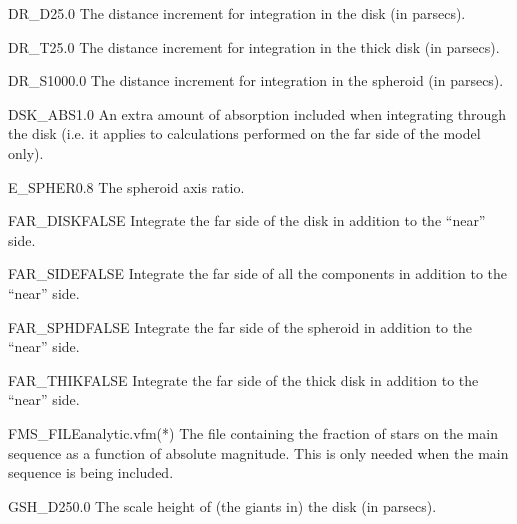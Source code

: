 \begin{key}{DR\_D}{25.0}{}
The distance increment for integration in the disk (in parsecs).
\end{key}

\begin{key}{DR\_T}{25.0}{}
The distance increment for integration in the thick disk (in parsecs).
\end{key}

\begin{key}{DR\_S}{1000.0}{}
The distance increment for integration in the spheroid (in parsecs).
\end{key}

\begin{key}{DSK\_ABS}{1.0}{}
An extra amount of absorption included when integrating through the disk (i.e.
it applies to calculations performed on the far side of the model only).
\end{key}

\begin{key}{E\_SPHER}{0.8}{}
The spheroid axis ratio.
\end{key}

\begin{key}{FAR\_DISK}{FALSE}{}
Integrate the far side of the disk in addition to the ``near'' side.
\end{key}

\begin{key}{FAR\_SIDE}{FALSE}{}
Integrate the far side of all the components in addition to the ``near'' side.
\end{key}

\begin{key}{FAR\_SPHD}{FALSE}{}
Integrate the far side of the spheroid in addition to the ``near'' side.
\end{key}

\begin{key}{FAR\_THIK}{FALSE}{}
Integrate the far side of the thick disk in addition to the ``near'' side.
\end{key}

\begin{key}{FMS\_FILE}{analytic.vfm}{(*)}
The file containing the fraction of stars on the main sequence as a function
of absolute magnitude. This is only needed when the main sequence is being
included.
\end{key}

\begin{key}{GSH\_D}{250.0}{}
The scale height of (the giants in) the disk (in parsecs).
\end{key}

